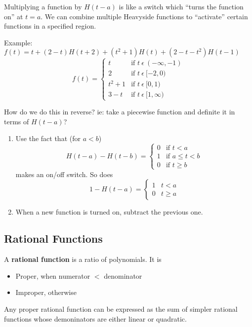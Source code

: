\documentclass[12pt]{article}
\begin{document}
Multiplying a function by $H(t-a)$ is like a switch which ``turns the function on'' at $t = a$. We can combine multiple Heavyside functions to ``activate'' certain functions in a specified region.

Example: $f(t) = t + (2-t)H(t+2) + (t^2+1)H(t) + (2-t-t^2)H(t-1)$
\[ f(t) =
   \begin{cases}
     t       & \text{if } t\ \epsilon\ (-\infty,-1)\\
     2       & \text{if } t\ \epsilon\ [-2,0)\\
     t^2 + 1 & \text{if } t\ \epsilon\ [0,1)\\
     3 - t   & \text{if } t\ \epsilon\ [1,\infty)
   \end{cases}
\]

How do we do this in reverse? ie: take a piecewise function and definite it in terms of $H(t-a)$?
\begin{enumerate}
\item Use the fact that (for $a < b$) \[ H(t-a) - H(t-b) = \begin{cases}0 & \text{if } t < a\\1 & \text{if } a \leq t < b\\0 & \text{if } t \geq b\end{cases} \] makes an on/off switch. So does
\[ 1 - H(t-a) =
    \begin{cases}
    1 & t < a\\
    0 & t \geq a
    \end{cases}
\]
\item When a new function is turned on, subtract the previous one.
\end{enumerate}

\subsection*{Rational Functions}
A {\bf rational function} is a ratio of polynomials. It is
\begin{itemize}
\item Proper, when numerator $<$ denominator
\item Improper, otherwise
\end{itemize}

Any proper rational function can be expressed as the sum of simpler rational functions whose demoninators are either linear or quadratic.
\end{document}
